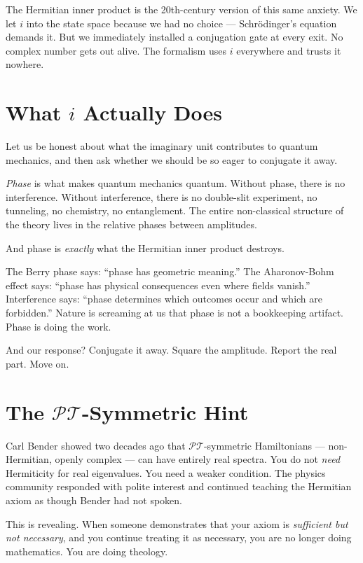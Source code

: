 \documentclass[11pt]{article}
\begin{document}
The Hermitian inner product is the 20th-century version of this same anxiety. We let $i$ into the state space because we had no choice --- Schr\"odinger's equation demands it. But we immediately installed a conjugation gate at every exit. No complex number gets out alive. The formalism uses $i$ everywhere and trusts it nowhere.

\section*{What $i$ Actually Does}

Let us be honest about what the imaginary unit contributes to quantum mechanics, and then ask whether we should be so eager to conjugate it away.

\textit{Phase} is what makes quantum mechanics quantum. Without phase, there is no interference. Without interference, there is no double-slit experiment, no tunneling, no chemistry, no entanglement. The entire non-classical structure of the theory lives in the relative phases between amplitudes.

And phase is \textit{exactly} what the Hermitian inner product destroys.

The Berry phase says: ``phase has geometric meaning.'' The Aharonov-Bohm effect says: ``phase has physical consequences even where fields vanish.'' Interference says: ``phase determines which outcomes occur and which are forbidden.'' Nature is screaming at us that phase is not a bookkeeping artifact. Phase is doing the work.

And our response? Conjugate it away. Square the amplitude. Report the real part. Move on.

\section*{The $\mathcal{PT}$-Symmetric Hint}

Carl Bender showed two decades ago that $\mathcal{PT}$-symmetric Hamiltonians --- non-Hermitian, openly complex --- can have entirely real spectra. You do not \textit{need} Hermiticity for real eigenvalues. You need a weaker condition. The physics community responded with polite interest and continued teaching the Hermitian axiom as though Bender had not spoken.

This is revealing. When someone demonstrates that your axiom is \textit{sufficient but not necessary}, and you continue treating it as necessary, you are no longer doing mathematics. You are doing theology.
\end{document}

